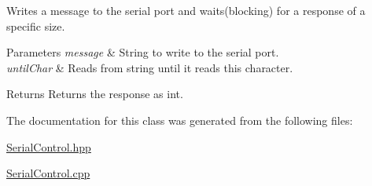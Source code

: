 Writes a message to the serial port and waits(blocking) for a response of a specific size. 


\begin{DoxyParams}{Parameters}
{\em message} & String to write to the serial port. \\
\hline
{\em until\+Char} & Reads from string until it reads this character. \\
\hline
\end{DoxyParams}
\begin{DoxyReturn}{Returns}
Returns the response as int. 
\end{DoxyReturn}


The documentation for this class was generated from the following files\+:\begin{DoxyCompactItemize}
\item 
\hyperlink{_serial_control_8hpp}{Serial\+Control.\+hpp}\item 
\hyperlink{_serial_control_8cpp}{Serial\+Control.\+cpp}\end{DoxyCompactItemize}
